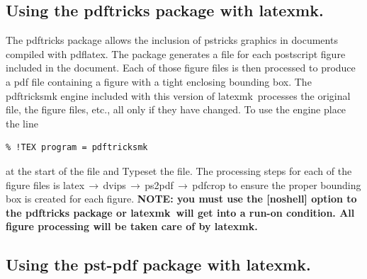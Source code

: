 \documentclass[11pt]{article}
\newcommand{\cmd}[1]{\textsf{#1}}
\newcommand{\To}{\,\(\to\)\,}
\newcommand{\latexmk}{\textsf{latexmk}}
\begin{document}
%
%

\subsection{Using the \cmd{pdftricks} package with \latexmk.}

The \cmd{pdftricks} package allows the inclusion of \cmd{pstricks} graphics in documents compiled with \cmd{pdflatex}. The package generates a file for each postscript figure included in the document. Each of those figure files is then processed to produce a \cmd{pdf} file containing a figure with a tight enclosing bounding box. The \cmd{pdftricksmk} engine included with this version of \latexmk\ processes the original file, the figure files, etc., all only if they have changed. To use the engine place the line
\begin{verbatim}
% !TEX program = pdftricksmk
\end{verbatim}
at the start of the file and Typeset the file. The processing steps for each of the figure files is \cmd{latex}\To\cmd{dvips}\To\cmd{ps2pdf}\To\cmd{pdfcrop} to ensure the proper bounding box is created for each figure. \textbf{NOTE: you must use the \cmd{[noshell]} option to the \cmd{pdftricks} package or \latexmk\ will get into a run-on condition. All figure processing will be taken care of by \latexmk.}

\subsection{Using the \cmd{pst-pdf} package with \latexmk.}
\end{document}
